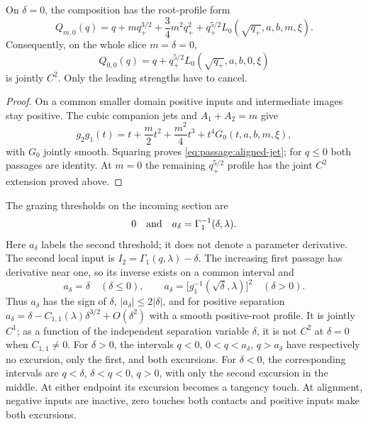 \begin{lemma}
\label{lem:passage:finite-inverse}
On $\delta=0$, the composition has the root-profile form
\begin{equation}\label{eq:passage:aligned-jet}
 Q_{m,0}(q)=q+mq_+^{3/2}+\frac34m^2q_+^2
                  +q_+^{5/2}L_0(\sqrt{q_+},a,b,m,\xi).
\end{equation}
Consequently, on the whole slice $m=\delta=0$,
\begin{equation}\label{eq:passage:finite-cancellation}
 Q_{0,0}(q)=q+q_+^{5/2}L_0(\sqrt{q_+},a,b,0,\xi)
\end{equation}
is jointly $C^2$. Only the leading strengths have to cancel.
\end{lemma}

\begin{proof}
On a common smaller domain positive inputs and intermediate images stay
positive. The cubic companion jets and $A_1+A_2=m$ give
\[
 g_2g_1(t)=t+\frac m2t^2+\frac{m^2}{4}t^3
                      +t^4G_0(t,a,b,m,\xi),
\]
with $G_0$ jointly smooth. Squaring proves
\eqref{eq:passage:aligned-jet}; for $q\le0$ both passages are identity.
At $m=0$ the remaining $q_+^{5/2}$ profile has the joint $C^2$
extension proved above.
\end{proof}

The grazing thresholds on the incoming section are
\begin{equation}\label{eq:passage:true-thresholds}
 0\quad\hbox{and}\quad a_\delta=\Gamma_1^{-1}(\delta,\lambda).
\end{equation}
Here $a_\delta$ labels the second threshold; it does not denote a
parameter derivative. The second local input is
$I_2=\Gamma_1(q,\lambda)-\delta$.
The increasing first passage has derivative near one, so its inverse
exists on a common interval and
\begin{equation}\label{eq:passage:threshold-formula}
 a_\delta=\delta\quad(\delta\le0),\qquad
 a_\delta=\bigl[g_1^{-1}(\sqrt\delta,\lambda)\bigr]^2
                                                \quad(\delta>0).
\end{equation}
Thus $a_\delta$ has the sign of $\delta$, $|a_\delta|\le2|\delta|$,
and for positive separation
$a_\delta=\delta-C_{1,1}(\lambda)\delta^{3/2}+O(\delta^2)$ with a
smooth positive-root profile. It is jointly $C^1$; as a function of the
independent separation variable $\delta$, it is not $C^2$ at $\delta=0$
when $C_{1,1}\ne0$.
For $\delta>0$, the intervals $q<0$, $0<q<a_\delta$, $q>a_\delta$
have respectively no excursion, only the first, and both excursions.
For $\delta<0$, the corresponding intervals are $q<\delta$,
$\delta<q<0$, $q>0$, with only the second excursion in the middle.
At either endpoint its excursion becomes a tangency touch. At alignment,
negative inputs are inactive, zero touches both contacts and positive
inputs make both excursions.

